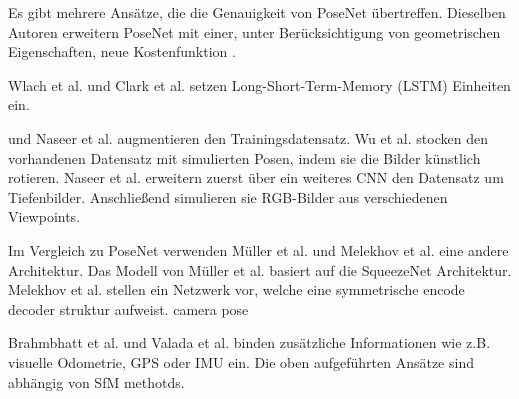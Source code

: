 Es gibt mehrere Ansätze, die die Genauigkeit von PoseNet übertreffen.
Dieselben Autoren erweitern PoseNet mit einer, unter Berücksichtigung von geometrischen Eigenschaften, neue Kostenfunktion \cite{kendallGeometricLossFunctions2017}. 

Wlach et al. \cite{walchImagebasedLocalizationUsing2016} und Clark et al. \cite{clarkVidLocDeepSpatioTemporal2017} setzen Long-Short-Term-Memory (LSTM) \cite{hochreiterLongShortTermMemory1997a} Einheiten ein. 


\citeauthor{wuDelvingDeeperConvolutional2017} und Naseer et al. \cite{naseerDeepRegressionMonocular2017} augmentieren den Trainingsdatensatz. 
Wu et al. \cite{wuDelvingDeeperConvolutional2017} stocken den vorhandenen Datensatz mit simulierten Posen, indem sie die Bilder künstlich rotieren. Naseer et al. \cite{naseerDeepRegressionMonocular2017} erweitern zuerst über ein weiteres CNN den Datensatz um Tiefenbilder. Anschließend simulieren sie RGB-Bilder aus verschiedenen Viewpoints.


Im Vergleich zu PoseNet verwenden Müller et al. \cite{mullerSQUEEZEPOSENETIMAGEBASED2017} und Melekhov et al.\cite{melekhovImageBasedLocalizationUsing2017} eine andere Architektur. 
Das Modell von Müller et al. \cite{mullerSQUEEZEPOSENETIMAGEBASED2017} basiert auf die SqueezeNet\cite{iandolaSqueezeNetAlexNetlevelAccuracy2016} Architektur. Melekhov et al.\cite{melekhovImageBasedLocalizationUsing2017} stellen ein Netzwerk vor, welche eine symmetrische encode decoder struktur aufweist.
camera pose

Brahmbhatt et al. \cite{brahmbhattGeometryAwareLearningMaps2018} und Valada et al. \cite{valadaDeepAuxiliaryLearning2018, valadaIncorporatingSemanticGeometric} binden zusätzliche Informationen wie z.B. visuelle Odometrie, GPS oder IMU ein.
Die oben aufgeführten Ansätze sind abhängig von SfM methotds.



% 
